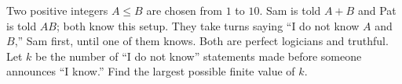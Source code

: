 Two positive integers $A\le B$ are chosen from $1$ to $10$. Sam is told $A+B$ and Pat is told $AB$; both know this setup. They take turns saying ``I do not know $A$ and $B$,'' Sam first, until one of them knows. Both are perfect logicians and truthful. Let $k$ be the number of ``I do not know'' statements made before someone announces ``I know.'' Find the largest possible finite value of $k$.
